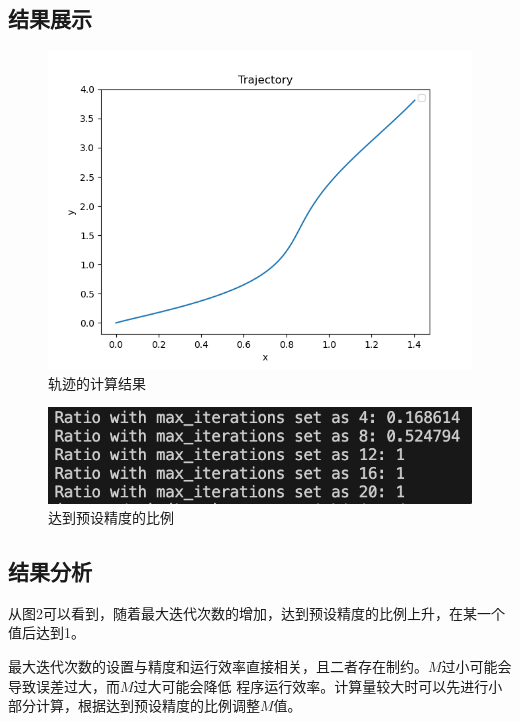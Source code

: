 \documentclass[UTF8]{ctexart}
\begin{document}
\subsection{结果展示}
\begin{figure}[H]
  \centering
  \includegraphics[scale=0.4]{plot.png}
  \caption{轨迹的计算结果}
\end{figure}
\begin{figure}[H]
  \centering
  \includegraphics[scale=0.6]{result.png}
  \caption{达到预设精度的比例}
\end{figure}

\subsection{结果分析}
从图2可以看到，随着最大迭代次数的增加，达到预设精度的比例上升，在某一个值后达到1。

最大迭代次数的设置与精度和运行效率直接相关，且二者存在制约。$M$过小可能会导致误差过大，而$M$过大可能会降低
程序运行效率。计算量较大时可以先进行小部分计算，根据达到预设精度的比例调整$M$值。



\end{document}
